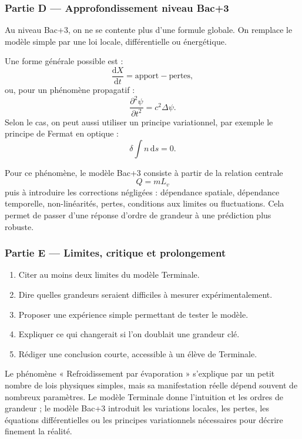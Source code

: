 \documentclass[11pt,a4paper]{article}
\begin{document}
\subsubsection*{Partie D — Approfondissement niveau Bac+3}

\begin{approfondissementbox}
Au niveau Bac+3, on ne se contente plus d'une formule globale. On remplace le modèle simple par une loi locale, différentielle ou énergétique.

Une forme générale possible est :
\[
\frac{\mathrm d X}{\mathrm dt}=\text{apport}-\text{pertes},
\]
ou, pour un phénomène propagatif :
\[
\frac{\partial^2 \psi}{\partial t^2}=c^2\Delta\psi.
\]
Selon le cas, on peut aussi utiliser un principe variationnel, par exemple le principe de Fermat en optique :
\[
\delta \int n\,\mathrm ds=0.
\]

Pour ce phénomène, le modèle Bac+3 consiste à partir de la relation centrale
\[
Q=mL_v
\]
puis à introduire les corrections négligées : dépendance spatiale, dépendance temporelle, non-linéarités, pertes, conditions aux limites ou fluctuations. Cela permet de passer d'une réponse d'ordre de grandeur à une prédiction plus robuste.
\end{approfondissementbox}

\subsubsection*{Partie E — Limites, critique et prolongement}

\begin{enumerate}
  \item Citer au moins deux limites du modèle Terminale.
  \item Dire quelles grandeurs seraient difficiles à mesurer expérimentalement.
  \item Proposer une expérience simple permettant de tester le modèle.
  \item Expliquer ce qui changerait si l'on doublait une grandeur clé.
  \item Rédiger une conclusion courte, accessible à un élève de Terminale.
\end{enumerate}

\begin{corrigebox}
Le phénomène « Refroidissement par évaporation » s'explique par un petit nombre de lois physiques simples, mais sa manifestation réelle dépend souvent de nombreux paramètres. Le modèle Terminale donne l'intuition et les ordres de grandeur ; le modèle Bac+3 introduit les variations locales, les pertes, les équations différentielles ou les principes variationnels nécessaires pour décrire finement la réalité.
\end{corrigebox}
\end{document}
